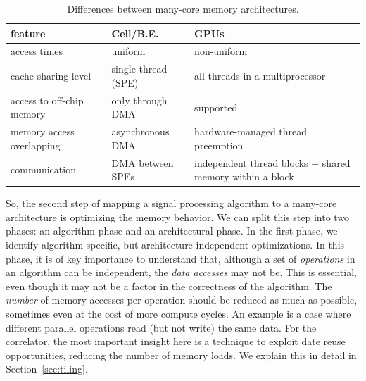\documentclass{article}
\begin{document}
\begin{table}[t]
\begin{center}
{\footnotesize
\begin{tabular}{|l|l|l|}
\hline
feature                   & Cell/B.E.                      & GPUs \\
\hline
access times              & uniform                        & non-uniform \\
cache sharing level       & single thread (SPE)            & all threads in a multiprocessor \\
access to off-chip memory & only through DMA               & supported \\
memory access overlapping & asynchronous DMA               & hardware-managed thread preemption \\
communication             & DMA between SPEs               & independent thread blocks + shared memory within a block \\
\hline
\end{tabular}
} %
\end{center}
\vspace{-0.5cm}
\caption{Differences between many-core memory architectures.}
\label{memory-properties}
\end{table}

So, the second step of mapping a signal processing algorithm to a many-core architecture
is optimizing the memory behavior. We can split this step into two phases:
an algorithm phase and an architectural phase.
In the first phase, we identify algorithm-specific, but
architecture-independent optimizations. 
In this phase, it is of key importance to understand that, although a
set of \emph{operations} in an algorithm can be independent, the \emph{data
  accesses} may not be.  This is essential, even though it may not be a
factor in the correctness of the algorithm. The \emph{number} of memory accesses per operation should
be reduced as much as possible, sometimes even at the cost of more
compute cycles. An example is a case
where different parallel operations read (but not write) the
same data.  For the correlator, the most important insight here
is a technique to exploit date reuse opportunities, reducing the number of memory
loads. We explain this in detail in Section~\ref{sec:tiling}.
\end{document}
